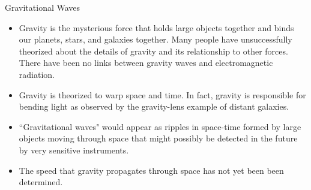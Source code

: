 {\white

{\Large Gravitational Waves}

\begin{itemize}

\item Gravity is the mysterious force that holds large objects together and binds our planets, stars, and galaxies together. Many people have unsuccessfully theorized about the details of gravity and its relationship to other forces. There have been no links between gravity waves and electromagnetic radiation.

\item Gravity is theorized to warp space and time. In fact, gravity is responsible for bending light as observed by the gravity-lens example of distant galaxies.

\item ``Gravitational waves" would appear as ripples in space-time formed by large objects moving through space that might possibly be detected in the future by very sensitive instruments.

\item The speed that gravity propagates through space has not yet been been determined.

\end{itemize}
}

